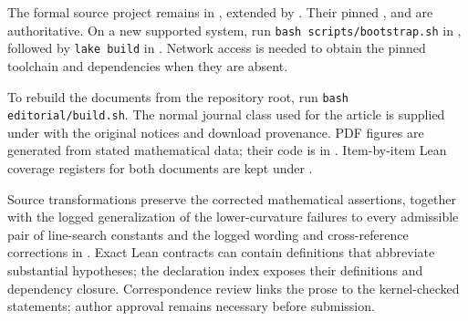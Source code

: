The formal source project remains in , extended by
. Their pinned
,  and 
are authoritative. On a new supported system, run
\texttt{bash scripts/bootstrap.sh} in , followed by
\texttt{lake build} in . Network access is needed to
obtain the pinned toolchain and dependencies when they are absent.

To rebuild the documents from the repository root, run
\texttt{bash editorial/build.sh}. The normal journal class used for the article
is supplied under  with the original notices
and download provenance. PDF figures are generated from stated mathematical
data; their code is in . Item-by-item Lean coverage
registers for both documents are kept under .

Source transformations preserve the corrected mathematical assertions, together
with the logged generalization of the lower-curvature failures to every
admissible pair of line-search constants and the logged wording and cross-reference
corrections in .
Exact Lean contracts can contain definitions that abbreviate substantial
hypotheses; the declaration index exposes their definitions and dependency
closure. Correspondence review links the prose to the kernel-checked
statements; author approval remains necessary before submission.
